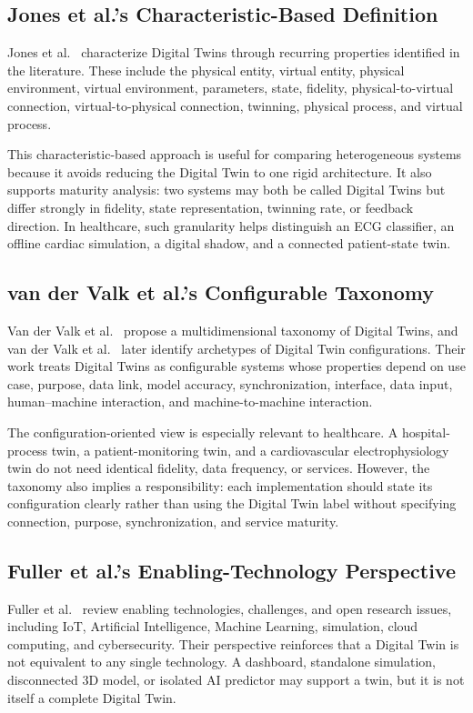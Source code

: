 \subsection{Jones et al.'s Characteristic-Based Definition}
Jones et al.~\cite{jones2020characterising} characterize Digital Twins through recurring properties identified in the literature. These include the physical entity, virtual entity, physical environment, virtual environment, parameters, state, fidelity, physical-to-virtual connection, virtual-to-physical connection, twinning, physical process, and virtual process.

This characteristic-based approach is useful for comparing heterogeneous systems because it avoids reducing the Digital Twin to one rigid architecture. It also supports maturity analysis: two systems may both be called Digital Twins but differ strongly in fidelity, state representation, twinning rate, or feedback direction. In healthcare, such granularity helps distinguish an ECG classifier, an offline cardiac simulation, a digital shadow, and a connected patient-state twin.

\subsection{van der Valk et al.'s Configurable Taxonomy}
Van der Valk et al.~\cite{vanderValk2020taxonomy} propose a multidimensional taxonomy of Digital Twins, and van der Valk et al.~\cite{vanderValk2021archetypes} later identify archetypes of Digital Twin configurations. Their work treats Digital Twins as configurable systems whose properties depend on use case, purpose, data link, model accuracy, synchronization, interface, data input, human--machine interaction, and machine-to-machine interaction.

The configuration-oriented view is especially relevant to healthcare. A hospital-process twin, a patient-monitoring twin, and a cardiovascular electrophysiology twin do not need identical fidelity, data frequency, or services. However, the taxonomy also implies a responsibility: each implementation should state its configuration clearly rather than using the Digital Twin label without specifying connection, purpose, synchronization, and service maturity.

\subsection{Fuller et al.'s Enabling-Technology Perspective}
Fuller et al.~\cite{fuller2020digital} review enabling technologies, challenges, and open research issues, including IoT, Artificial Intelligence, Machine Learning, simulation, cloud computing, and cybersecurity. Their perspective reinforces that a Digital Twin is not equivalent to any single technology. A dashboard, standalone simulation, disconnected 3D model, or isolated AI predictor may support a twin, but it is not itself a complete Digital Twin.

